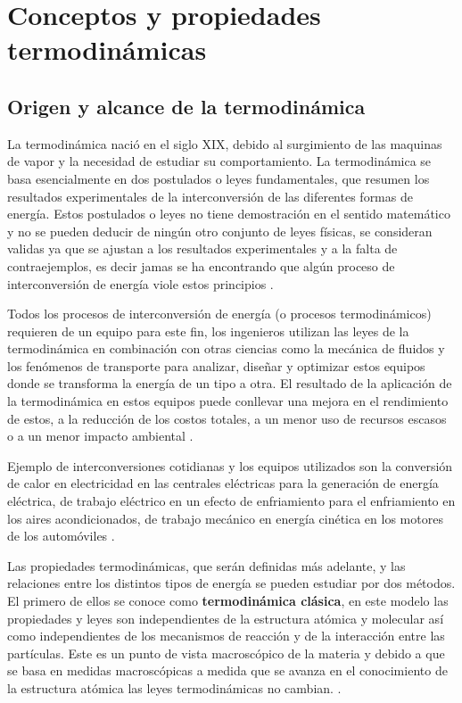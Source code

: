 \documentclass[master.tex]{subfiles}
\begin{document}
\section{Conceptos y propiedades termodinámicas}

\subsection{Origen y alcance de la termodinámica}

    La termodinámica nació en el siglo XIX, debido al surgimiento de las maquinas de vapor y la necesidad de estudiar su comportamiento. La termodinámica se basa esencialmente en dos postulados o leyes fundamentales, que resumen los resultados experimentales de la interconversión de las diferentes formas de energía. Estos postulados o leyes no tiene demostración en el sentido matemático y no se pueden deducir de ningún otro conjunto de leyes físicas, se consideran validas ya que se ajustan a los resultados experimentales y a la falta de contraejemplos, es decir jamas se ha encontrando que algún proceso de interconversión de energía viole estos principios \parencites{glasstone}{smith-vanness}. 
    
    Todos los procesos de interconversión de energía (o procesos termodinámicos) requieren de un equipo para este fin, los ingenieros utilizan las leyes de la termodinámica en combinación con otras ciencias como la mecánica de fluidos y los fenómenos de transporte para analizar, diseñar y optimizar estos equipos donde se transforma la energía de un tipo a otra. El resultado de la aplicación de la termodinámica en estos equipos puede conllevar una mejora en el rendimiento de estos, a la reducción de los costos totales, a un menor uso de recursos escasos o a un menor impacto ambiental \parencites{wark}{moranshapiro}.
    
    Ejemplo de interconversiones cotidianas y los equipos utilizados son la conversión de calor en electricidad en las centrales eléctricas para la generación de energía eléctrica, de trabajo eléctrico en un efecto de enfriamiento para el enfriamiento en los aires acondicionados, de trabajo mecánico en energía cinética en los motores de los automóviles \parencite{faires}.

    Las propiedades termodinámicas, que serán definidas más adelante, y las relaciones entre los distintos tipos de energía se pueden estudiar por dos métodos. El primero de ellos se conoce como \textbf{termodinámica clásica}, en este modelo las propiedades y leyes son independientes de la estructura atómica y molecular así como independientes de los mecanismos de reacción y de la interacción entre las partículas. Este es un punto de vista macroscópico de la materia y debido a que se basa en medidas macroscópicas a medida que se avanza en el conocimiento de la estructura atómica las leyes termodinámicas no cambian. \parencites{faires}{glasstone}{wark}.
\end{document}
